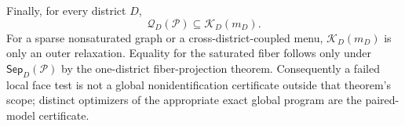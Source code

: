 Finally, for every district \(D\),
\[
\mathcal Q_D(\mathcal P)\subseteq\mathcal K_D(m_D).
\]
For a sparse nonsaturated graph or a cross-district-coupled menu, \(\mathcal K_D(m_D)\) is only an outer relaxation.  Equality for the saturated fiber follows only under \(\mathsf{Sep}_D(\mathcal P)\) by the one-district fiber-projection theorem.  Consequently a failed local face test is not a global nonidentification certificate outside that theorem's scope; distinct optimizers of the appropriate exact global program are the paired-model certificate.